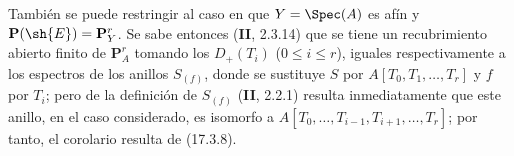 También se puede restringir al caso en que $Y=\Spec(A)$ es afín y $\mathbf{P}(\sh{E})=\mathbf{P}^r_Y$. Se sabe entonces (\textbf{II}, 2.3.14) que se tiene un recubrimiento abierto finito de $\mathbf{P}^r_A$ tomando los $D_+(T_i)$ ($0\leq i\leq r$), iguales respectivamente a los espectros de los anillos $S_{(f)}$, donde se sustituye $S$ por $A[T_0,T_1,\ldots,T_r]$ y $f$ por $T_i$; pero de la definición de $S_{(f)}$ (\textbf{II}, 2.2.1) resulta inmediatamente que este anillo, en el caso considerado, es isomorfo a $A[T_0,\ldots,T_{i-1},T_{i+1},\ldots,T_r]$; por tanto, el corolario resulta de (17.3.8).


